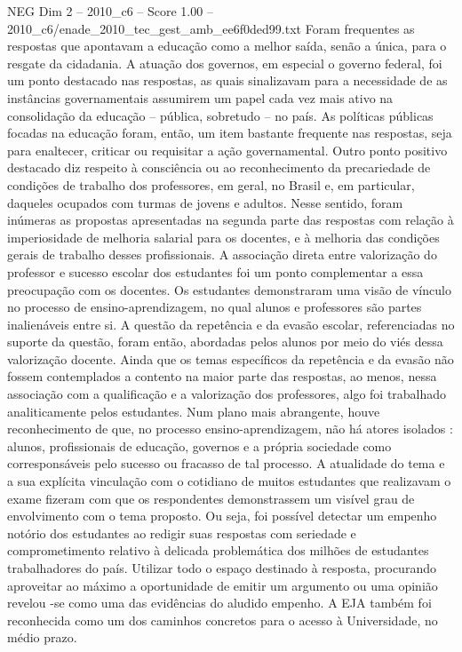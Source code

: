 \begin{textsample}{NEG Dim 2 – 2010\_c6 – Score 1.00 – 2010\_c6/enade\_2010\_tec\_gest\_amb\_ee6f0ded99.txt}
Foram frequentes as respostas que apontavam a educação como a melhor saída, senão a única, para o resgate da cidadania.
A atuação dos governos, em especial o governo federal, foi um ponto destacado nas respostas, as quais sinalizavam para a necessidade de as instâncias governamentais assumirem um papel cada vez mais ativo na consolidação da educação – pública, sobretudo – no país.
As políticas públicas focadas na educação foram, então, um item bastante frequente nas respostas, seja para enaltecer, criticar ou requisitar a ação governamental.
Outro ponto positivo destacado diz respeito à consciência ou ao reconhecimento da precariedade de condições de trabalho dos professores, em geral, no Brasil e, em particular, daqueles ocupados com turmas de jovens e adultos.
Nesse sentido, foram inúmeras as propostas apresentadas na segunda parte das respostas com relação à imperiosidade de melhoria salarial para os docentes, e à melhoria das condições gerais de trabalho desses profissionais.
A associação direta entre valorização do professor e sucesso escolar dos estudantes foi um ponto complementar a essa preocupação com os docentes.
Os estudantes demonstraram uma visão de vínculo no processo de ensino-aprendizagem, no qual alunos e professores são partes inalienáveis entre si.
A questão da repetência e da evasão escolar, referenciadas no suporte da questão, foram então, abordadas pelos alunos por meio do viés dessa valorização docente.
Ainda que os temas específicos da repetência e da evasão não fossem contemplados a contento na maior parte das respostas, ao menos, nessa associação com a qualificação e a valorização dos professores, algo foi trabalhado analiticamente pelos estudantes.
Num plano mais abrangente, houve reconhecimento de que, no processo ensino-aprendizagem, não há atores isolados : alunos, profissionais de educação, governos e a própria sociedade como corresponsáveis pelo sucesso ou fracasso de tal processo.
A atualidade do tema e a sua explícita vinculação com o cotidiano de muitos estudantes que realizavam o exame fizeram com que os respondentes demonstrassem um visível grau de envolvimento com o tema proposto.
Ou seja, foi possível detectar um empenho notório dos estudantes ao redigir suas respostas com seriedade e comprometimento relativo à delicada problemática dos milhões de estudantes trabalhadores do país.
Utilizar todo o espaço destinado à resposta, procurando aproveitar ao máximo a oportunidade de emitir um argumento ou uma opinião revelou -se como uma das evidências do aludido empenho.
A EJA também foi reconhecida como um dos caminhos concretos para o acesso à Universidade, no médio prazo.

\end{textsample}
